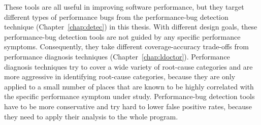 These tools are all useful in improving software performance, 
but they target different types of performance bugs 
from the performance-bug detection technique (Chapter~\ref{chap:detec}) in this thesis. 
With different design goals, these performance-bug detection tools are not guided by any specific
performance symptoms. Consequently, they take different
coverage-accuracy trade-offs from performance diagnosis techniques (Chapter~\ref{chap:ldoctor}).
Performance diagnosis techniques try
to cover a wide variety of root-cause categories and are more
aggressive in identifying root-cause categories, because they are
only applied to a small number of places that are known to
be highly correlated with the specific performance symptom
under study. Performance-bug detection tools have to be more
conservative and try hard to lower false positive rates, 
because they need to apply their analysis to the whole program. 

